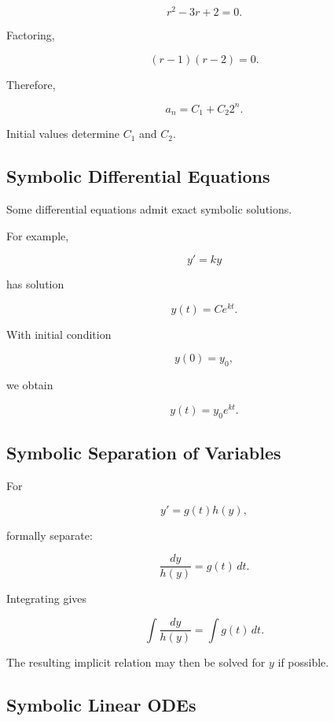 \[
r^2-3r+2=0.
\]

Factoring,

\[
(r-1)(r-2)=0.
\]

Therefore,

\[
\boxed{
a_n
=
C_1
+
C_2 2^n.
}
\]

Initial values determine \(C_1\) and \(C_2\).

\subsection{Symbolic Differential Equations}
\label{subsec:symbolic-differential-equations}

Some differential equations admit exact symbolic solutions.

For example,

\[
y'=ky
\]

has solution

\[
\boxed{
y(t)
=
Ce^{kt}.
}
\]

With initial condition

\[
y(0)=y_0,
\]

we obtain

\[
\boxed{
y(t)
=
y_0e^{kt}.
}
\]

\subsection{Symbolic Separation of Variables}
\label{subsec:symbolic-separation-variables}

For

\[
y'=g(t)h(y),
\]

formally separate:

\[
\boxed{
\frac{dy}{h(y)}
=
g(t)\,dt.
}
\]

Integrating gives

\[
\boxed{
\int
\frac{dy}{h(y)}
=
\int
g(t)\,dt.
}
\]

The resulting implicit relation may then be solved for \(y\) if possible.

\subsection{Symbolic Linear ODEs}
\label{subsec:symbolic-linear-odes}


